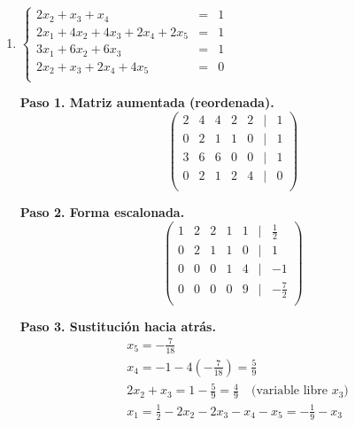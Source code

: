 \begin{prob}
\begin{enumerate}[$a)$]
\begin{myproof}
    \textbf{Paso 4. Solución paramétrica (cuando existe).}
    \[
    \boxed{\begin{pmatrix} x \\ y \\ z \end{pmatrix} =
    \begin{pmatrix} 5b_1 - 2b_2 \\ b_2 - 2b_1 \\ 0 \end{pmatrix} +
    z \begin{pmatrix} 2 \\ 0 \\ 1 \end{pmatrix}}, \quad z \in \mathbb{R}.
    \]
    \end{myproof}
	
	\item $\left\lbrace \begin{array}{ccc}
	2x_2+x_3+x_4&=&1\\
	2x_1+4x_2+4x_3+2x_4+2x_5&=&1\\
	3x_1+6x_2+6x_3&=&1\\
	2x_2+x_3+2x_4+4x_5&=&0\\
	\end{array} \right. $ 
	
	\begin{myproof}
    \textbf{Paso 1. Matriz aumentada (reordenada).}
    \[
    \begin{pmatrix}
    2 & 4 & 4 & 2 & 2 & | & 1 \\
    0 & 2 & 1 & 1 & 0 & | & 1 \\
    3 & 6 & 6 & 0 & 0 & | & 1 \\
    0 & 2 & 1 & 2 & 4 & | & 0 \\
    \end{pmatrix}
    \]
    
    \textbf{Paso 2. Forma escalonada.}
    \[
    \begin{pmatrix}
    1 & 2 & 2 & 1 & 1 & | & \frac{1}{2} \\
    0 & 2 & 1 & 1 & 0 & | & 1 \\
    0 & 0 & 0 & 1 & 4 & | & -1 \\
    0 & 0 & 0 & 0 & 9 & | & -\frac{7}{2} \\
    \end{pmatrix}
    \]

    \textbf{Paso 3. Sustitución hacia atrás.}
    \begin{align*}
    &x_5 = -\frac{7}{18} \\
    &x_4 = -1 - 4\left(-\frac{7}{18}\right) = \frac{5}{9} \\
    &2x_2 + x_3 = 1 - \frac{5}{9} = \frac{4}{9} \quad \text{(variable libre } x_3\text{)} \\
    &x_1 = \frac{1}{2} - 2x_2 - 2x_3 - x_4 - x_5 = -\frac{1}{9} - x_3
    \end{align*}
    

\end{myproof}
\end{enumerate}
\end{prob}
